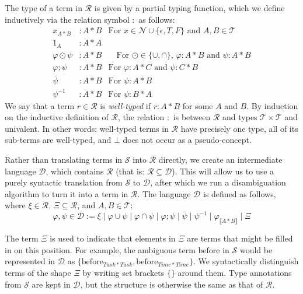 \documentclass[12pt]{article}
\newcommand{\typetyped}[2]{{#1}_{\llbracket #2 \rrbracket}}
\newcommand{\conv}[1]{{#1}^{-1}}
\begin{document}
The type of a term in $\mathcal{R}$ is given by a partial typing function, which we define inductively via the relation symbol $:$ as follows:
\begin{align*}
x_{A*B} &: A * B & \text{For $x \in \mathcal{N} \cup \{\epsilon, T, F\}$ and $A,B\in \mathcal{T}$}\\
1_{A} &: A * A&\\
\varphi \odot \psi &: A * B &\quad\text{For $\odot \in \{\cup,\cap\}$, $\varphi : A * B$ and $\psi : A * B$}\\
\varphi ; \psi &: A * B &\text{For $\varphi : A * C$ and $\psi : C * B$}\\
\overline{\psi} &: A * B &\text{For $\psi : A * B$}\\
\conv{\psi} &: A * B &\text{For $\psi : B * A$}
\end{align*}
We say that a term $r\in \mathcal{R}$ is \emph{well-typed} if $r : A*B$ for some $A$ and $B$.
By induction on the inductive definition of $\mathcal{R}$, the relation $:$ is between $\mathcal{R}$ and types $\mathcal{T}\times\mathcal{T}$ and univalent.
In other words: well-typed terms in $\mathcal{R}$ have precisely one type, all of its sub-terms are well-typed, and $\bot$ does not occur as a pseudo-concept.

Rather than translating terms in $\mathcal{S}$ into $\mathcal{R}$ directly, we create an intermediate language $\mathcal{D}$, which contains $\mathcal{R}$ (that is: $\mathcal{R} \subseteq \mathcal{D}$).
This will allow us to use a purely syntactic translation from $\mathcal{S}$ to $\mathcal{D}$, after which we run a disambiguation algorithm to turn it into a term in $\mathcal{R}$.
The language $\mathcal{D}$ is defined as follows, where $\xi \in \mathcal{R}$, $\Xi \subseteq \mathcal{R}$, and $A,B\in\mathcal{T}$:
\[
\varphi,\psi\in\mathcal{D} \mathbin{:=} \xi \mid \varphi \cup \psi \mid \varphi \cap \psi \mid \varphi ; \psi \mid \overline{\psi}\mid \conv{\psi} \mid \typetyped{\varphi}{A*B} \mid \Xi
\]

The term $\Xi$ is used to indicate that elements in $\Xi$ are terms that might be filled in on this position.
For example, the ambiguous term $\mathrm{before}$ in $\mathcal{S}$ would be represented in $\mathcal{D}$ as $\{\mathrm{before}_{Task*Task},\mathrm{before}_{Time*Time}\}$.
We syntactically distinguish terms of the shape $\Xi$ by writing set brackets $\{\}$ around them.
Type annotations from $\mathcal{S}$ are kept in $\mathcal{D}$, but the structure is otherwise the same as that of $\mathcal{R}$.
\end{document}
